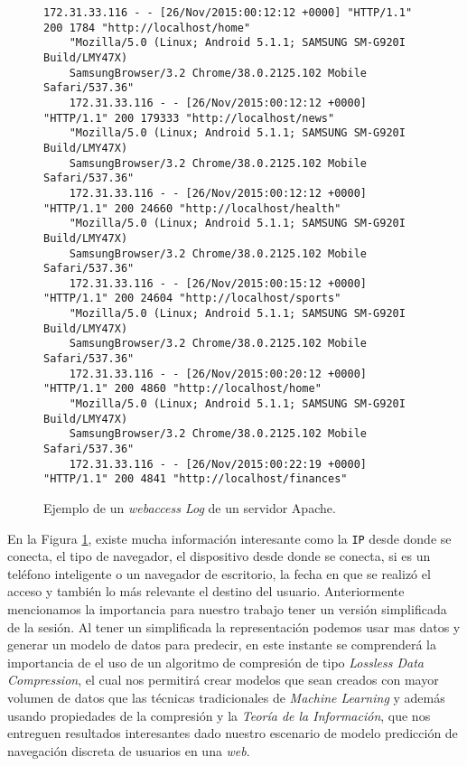 \begin{figure}[tb]
	\centering
	\begin{lstlisting}[frame=single,basicstyle=\ttfamily\tiny,]
	172.31.33.116 - - [26/Nov/2015:00:12:12 +0000] "HTTP/1.1" 200 1784 "http://localhost/home" 
	"Mozilla/5.0 (Linux; Android 5.1.1; SAMSUNG SM-G920I Build/LMY47X) 
	SamsungBrowser/3.2 Chrome/38.0.2125.102 Mobile Safari/537.36"
	172.31.33.116 - - [26/Nov/2015:00:12:12 +0000] "HTTP/1.1" 200 179333 "http://localhost/news" 
	"Mozilla/5.0 (Linux; Android 5.1.1; SAMSUNG SM-G920I Build/LMY47X) 
	SamsungBrowser/3.2 Chrome/38.0.2125.102 Mobile Safari/537.36"
	172.31.33.116 - - [26/Nov/2015:00:12:12 +0000] "HTTP/1.1" 200 24660 "http://localhost/health" 
	"Mozilla/5.0 (Linux; Android 5.1.1; SAMSUNG SM-G920I Build/LMY47X) 
	SamsungBrowser/3.2 Chrome/38.0.2125.102 Mobile Safari/537.36"
	172.31.33.116 - - [26/Nov/2015:00:15:12 +0000] "HTTP/1.1" 200 24604 "http://localhost/sports" 
	"Mozilla/5.0 (Linux; Android 5.1.1; SAMSUNG SM-G920I Build/LMY47X) 
	SamsungBrowser/3.2 Chrome/38.0.2125.102 Mobile Safari/537.36"
	172.31.33.116 - - [26/Nov/2015:00:20:12 +0000] "HTTP/1.1" 200 4860 "http://localhost/home" 
	"Mozilla/5.0 (Linux; Android 5.1.1; SAMSUNG SM-G920I Build/LMY47X) 
	SamsungBrowser/3.2 Chrome/38.0.2125.102 Mobile Safari/537.36"
	172.31.33.116 - - [26/Nov/2015:00:22:19 +0000] "HTTP/1.1" 200 4841 "http://localhost/finances" 
	\end{lstlisting}
	
	
	
	\caption{Ejemplo de un \emph{webaccess Log} de un servidor Apache.}
	\label{fig:accesslog-apache-teleton}
\end{figure}


  En la Figura \ref{fig:accesslog-apache-teleton}, existe mucha información interesante como la \texttt{IP} desde donde se conecta, el tipo de navegador, el dispositivo desde donde se conecta, si es un teléfono inteligente o un navegador de escritorio, la fecha en que se realizó el acceso y también lo más relevante el destino del usuario. Anteriormente mencionamos la importancia para nuestro trabajo tener un versión simplificada de la sesión. Al tener un simplificada la representación podemos usar mas datos y generar un modelo de datos para predecir, en este instante se comprenderá la importancia de el uso de un algoritmo de compresión de tipo \emph{Lossless Data Compression}, el cual nos permitirá crear modelos que sean creados con mayor volumen de datos que las técnicas tradicionales de \emph{Machine Learning} y además usando propiedades de la compresión y la \emph{Teoría de la Información}, que nos entreguen resultados interesantes dado nuestro escenario de modelo predicción de navegación discreta de usuarios en una \emph{web}.
   
